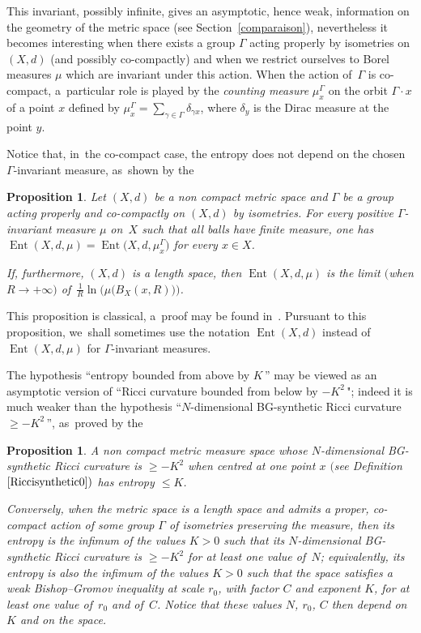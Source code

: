 \documentclass[pdftex]{sigma}
\numberwithin{equation}{section}
\newtheorem{prop}[theor]{Proposition}
\newcommand{\Ent}{\operatorname{Ent}}
\begin{document}
This invariant, possibly infinite, gives an asymptotic, hence weak, information on the geometry of the metric space (see Section~\ref{comparaison}), nevertheless it becomes interesting
when there exists a group $ \Gamma $ acting properly by isometries on $ (X,d) $ (and possibly co-compactly) and when we restrict ourselves to Borel measures $ \mu $ which are invariant under this action. When the action of~$\Gamma$ is co-compact, a~particular role is played by the \emph{counting measure} $ \mu_{x}^{\Gamma} $ on the orbit $ \Gamma \cdot x $ of a point $ x $ defined by $ \mu^\Gamma_x = \sum_{\gamma \in \Gamma} \delta_{\gamma x}$, where $\delta_y$ is the Dirac measure at the point $y$.

Notice that, in~the co-compact case, the entropy does not depend on the chosen $ \Gamma$-invariant measure, as~shown by the

\begin{prop}\label{Entropies1}
Let $(X,d)$ be a non compact metric space and $ \Gamma $ be a group acting properly and co-compactly on $(X,d)$
by isometries. For every positive $\Gamma$-invariant measure $\mu $ on~$X$ such that all balls have finite measure, one has $\Ent (X,d, \mu) =\Ent \big(X,d, \mu_{x}^{\Gamma}\big)$ for every $x \in X$.

If, furthermore, $(X,d)$ is a length space, then $\Ent (X,d, \mu)$ is the limit $($when $R \to +\infty)$ of~$ \frac{1}{R} \ln \big(\mu \big(B_X (x, R)\big)\big)$.
\end{prop}

This proposition is classical, a~proof may be found in~\cite[Proposition~3.3]{BCGS}.
Pursuant to this proposition, we~shall sometimes use the notation $ \Ent (X,d) $ instead of~$ \Ent (X,d, \mu) $ for $\Gamma$-invariant measures.

The hypothesis ``entropy bounded from above by $K\,$'' may be viewed
as an asymptotic version of ``Ricci curvature bounded from below by
$- K^2\,$"; indeed it is much weaker than the hypothesis ``$N$-dimensional BG-synthetic Ricci curvature $\ge - K^2\,$'', as~proved by the

\begin{prop}\label{BishopvsEntropy}
A non compact metric measure space whose $N$-dimensional BG-synthetic Ricci curvature is $\ge -K^2$ when centred at one point $x$ $($see Definition~$\ref{Riccisynthetic0})$ has entropy $\le K$.

Conversely, when the metric space is a length space and admits a proper,
co-compact action of some group $\Gamma$ of isometries preserving the measure, then its entropy is the infimum of the values $K>0$ such that its $N$-dimensional BG-synthetic Ricci curvature is $\ge -K^2$ for at least one value of~$N$; equivalently, its entropy is also the infimum of the values $K>0$ such that the space satisfies a weak Bishop--Gromov inequality at
scale $r_0$, with factor $C$ and exponent $K$, for at least one value of~$r_0$ and of~$C$. Notice that these values $N$, $r_0$, $C$ then depend on $K$
and on the space.
\end{prop}
\end{document}
